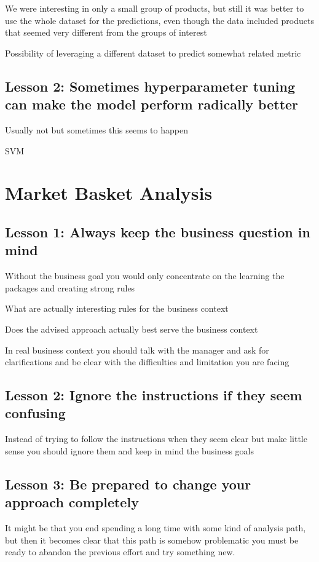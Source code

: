 \documentclass[12pt,a4paper,leqno]{report}
\theoremstyle{plain}
\theoremstyle{definition}
\theoremstyle{remark}
\begin{document}
We were interesting in only a small group of products, but still it was better to use the whole dataset
for the predictions, even though the data included products that seemed very different from the
groups of interest

Possibility of leveraging a different dataset to predict somewhat related metric

\subsection{Lesson 2: Sometimes hyperparameter tuning can make the model perform radically better}

Usually not but sometimes this seems to happen

SVM

\section{Market Basket Analysis}

\subsection{Lesson 1: Always keep the business question in mind}

Without the business goal you would only concentrate on the learning the packages and creating
strong rules

What are actually interesting rules for the business context

Does the advised approach actually best serve the business context

In real business context you should talk with the manager and ask for clarifications
and be clear with the difficulties and limitation you are facing

\subsection{Lesson 2: Ignore the instructions if they seem confusing}

Instead of trying to follow the instructions when they seem clear but make little
sense you should ignore them and keep in mind the business goals

\subsection{Lesson 3: Be prepared to change your approach completely}

It might be that you end spending a long time with some kind of
analysis path, but then it becomes clear that this path is somehow problematic
you must be ready to abandon the previous effort and try something new.
\end{document}
